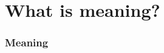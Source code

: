 \documentclass{beamer}
\begin{document}
\section{What is meaning?}

\begin{frame}
\frametitle{Meaning}
\end{frame}
\end{document}
